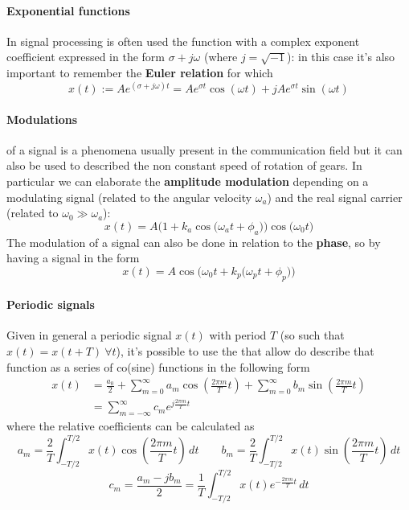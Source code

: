 	\paragraph{Exponential functions} In signal processing is often used the  function with a complex exponent coefficient expressed in the form $\sigma + j \omega$ (where $j = \sqrt{-1}$): in this case it's also important to remember the \textbf{Euler relation} for which
	\begin{equation}
		x(t) := A e^{(\sigma + j \omega) t } = A e^{\sigma t} \cos(\omega t) + jAe^{\sigma t}\sin(\omega t)
	\end{equation}
	
	\paragraph{Modulations}  of a signal is a phenomena usually present in the communication field but it can also be used to described the non constant speed of rotation of gears. In particular we can elaborate the \textbf{amplitude modulation} depending on a modulating signal (related to the angular velocity $\omega_a$) and the real signal carrier (related to $\omega_0 \gg \omega_a$):
	\begin{equation}
		x(t) =  A \Big(1 + k_a \cos\big(\omega_a t+ \phi_a\big)\Big) \cos\big(\omega_0 t\big)
	\end{equation}
 	The modulation of a signal can also be done in relation to the \textbf{phase}, so by having a signal in the form
 	\begin{equation}
 		x(t) = A \cos\Big( \omega_0 t + k_p\big(\omega_p t + \phi_p\big) \Big)
 	\end{equation}	
 	
 	\paragraph{Periodic signals} Given in general a periodic signal $x(t)$ with period $T$ (so such that $x(t) = x(t+T) \ \forall t$), it's possible to use the  that allow do describe that function as a series of co(sine) functions in the following form
 	\begin{equation}
 	\begin{split}
 		x(t) & = \frac{a_0}2 + \sum_{m=0}^\infty a_m \cos\left( \frac{2\pi m}{T} t \right) + \sum_{m=0}^\infty b_m \sin\left( \frac{2\pi m}{T} t \right) \\ & = \sum_{m=-\infty}^\infty c_m e^{j\frac{2\pi m}T t}
 	\end{split}
 	\end{equation}
 	where the relative coefficients can be calculated as
 	\[ a_m = \frac 2 T \int_{-T/2}^{T/2} x(t) \cos\left( \frac{2\pi m}{T} t\right) \, dt \qquad  b_m = \frac 2 T \int_{-T/2}^{T/2} x(t) \sin\left( \frac{2\pi m}{T} t\right) \, dt\]
 	\[ c_m = \frac{a_m -j b_m}{2} = \frac 1 T \int_{-T/2}^{T/2} x(t) e^{- \frac{2\pi m}{T} t} \, dt \]
 	
